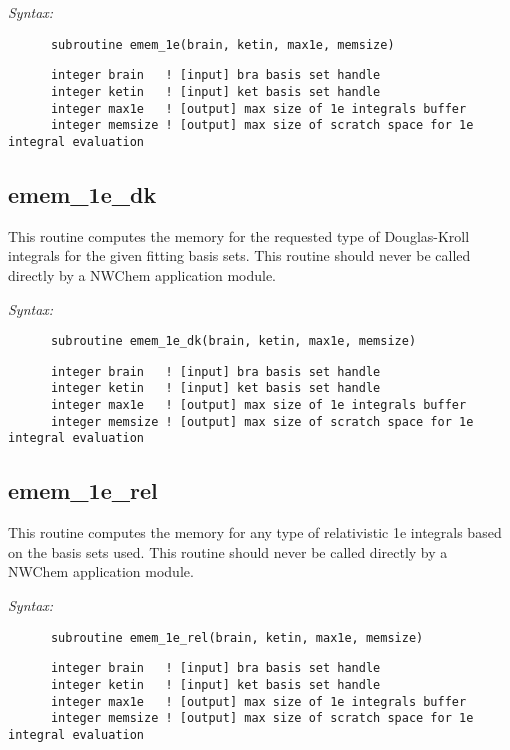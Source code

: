 {\it Syntax:} 
\begin{verbatim} 
      subroutine emem_1e(brain, ketin, max1e, memsize) 
\end{verbatim} 
\begin{verbatim} 
      integer brain   ! [input] bra basis set handle 
      integer ketin   ! [input] ket basis set handle 
      integer max1e   ! [output] max size of 1e integrals buffer 
      integer memsize ! [output] max size of scratch space for 1e integral evaluation 
\end{verbatim} 
\subsection{emem\_1e\_dk} 
This routine computes the memory for the requested type of   
Douglas-Kroll integrals for the given fitting basis sets. 
This routine should never be called directly by a  
NWChem application module. 
 
{\it Syntax:} 
\begin{verbatim} 
      subroutine emem_1e_dk(brain, ketin, max1e, memsize) 
\end{verbatim} 
\begin{verbatim} 
      integer brain   ! [input] bra basis set handle 
      integer ketin   ! [input] ket basis set handle 
      integer max1e   ! [output] max size of 1e integrals buffer 
      integer memsize ! [output] max size of scratch space for 1e integral evaluation 
\end{verbatim} 
\subsection{emem\_1e\_rel} 
This routine computes the memory for any type of relativistic 1e  
integrals based on the basis sets used.   
This routine should never be called directly by a  
NWChem application module. 
 
{\it Syntax:} 
\begin{verbatim} 
      subroutine emem_1e_rel(brain, ketin, max1e, memsize) 
\end{verbatim} 
\begin{verbatim} 
      integer brain   ! [input] bra basis set handle 
      integer ketin   ! [input] ket basis set handle 
      integer max1e   ! [output] max size of 1e integrals buffer 
      integer memsize ! [output] max size of scratch space for 1e integral evaluation 
\end{verbatim} 
